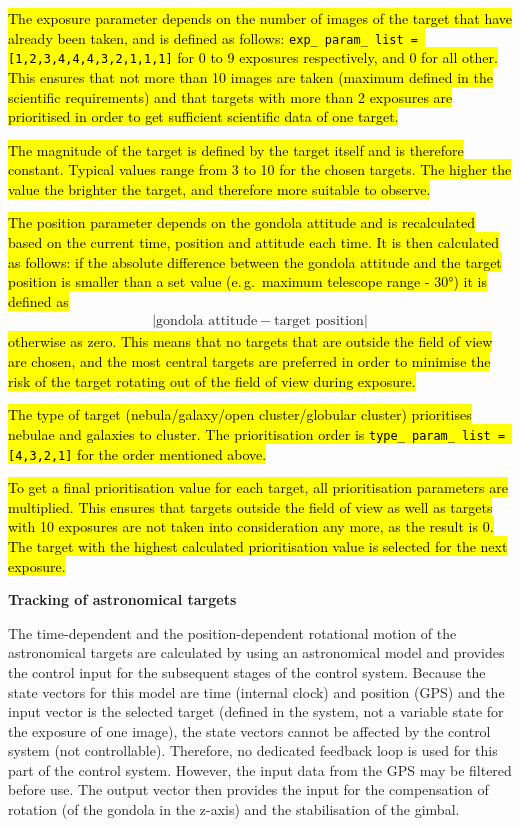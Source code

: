 \hl{The exposure parameter depends on the number of images of the target that have already been taken, and is defined as follows: \texttt{exp\_ param\_ list = [1,2,3,4,4,4,3,2,1,1,1]} for 0 to 9 exposures respectively, and 0 for all other. This ensures that not more than 10 images are taken (maximum defined in the scientific requirements) and that targets with more than 2 exposures are prioritised in order to get sufficient scientific data of one target.
}

\hl{The magnitude of the target is defined by the target itself and is therefore constant. Typical values range from 3 to 10 for the chosen targets. The higher the value the brighter the target, and therefore more suitable to observe.
}

\hl{The position parameter depends on the gondola attitude and is recalculated based on the current time, position and attitude each time. It is then calculated as follows: if the absolute difference between the gondola attitude and the target position is smaller than a set value (e.\,g.~maximum telescope range - $\ang{30}$) it is defined as 
}
\begin{align*}
	\left|\text{gondola attitude} - \text{target position} \right|
\end{align*}
\hl{otherwise as zero. This means that no targets that are outside the field of view are chosen, and the most central targets are preferred in order to minimise the risk of the target rotating out of the field of view during exposure.
}

\hl{The type of target (nebula/galaxy/open cluster/globular cluster) prioritises nebulae and galaxies to cluster. The prioritisation order is \texttt{type\_ param\_ list = [4,3,2,1]} for the order mentioned above.
}

\hl{To get a final prioritisation value for each target, all prioritisation parameters are multiplied. This ensures that targets outside the field of view as well as targets with 10 exposures are not taken into consideration any more, as the result is 0. The target with the highest calculated prioritisation value is selected for the next exposure.
}



\textbf{Tracking of astronomical targets}

The time-dependent and the position-dependent rotational motion of the astronomical targets are calculated by using an astronomical model and provides the control input for the subsequent stages of the control system. Because the state vectors for this model are time (internal clock) and position (GPS) and the input vector is the selected target (defined in the system, not a variable state for the exposure of one image), the state vectors cannot be affected by the control system (not controllable). Therefore, no dedicated feedback loop is used for this part of the control system. However, the input data from the GPS may be filtered before use. The output vector then provides the input for the compensation of rotation (of the gondola in the z-axis) and the stabilisation of the gimbal.


